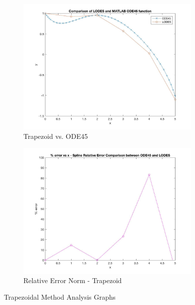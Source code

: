 \documentclass[12pt, titlepage]{article}
\begin{document}
\begin{figure}[H]
\centering
\begin{subfigure}{.55\textwidth}
  \centering
  \includegraphics[width=\linewidth]{images/Test4/2LODESvsMATLABPlot.jpg}
  \caption{Trapezoid vs. ODE45}
  \label{fig:trap4a}
\end{subfigure}%
\begin{subfigure}{.55\textwidth}
  \centering
  \includegraphics[width=\linewidth]{images/Test4/2RelativeErrorPlot.jpg}
  \caption{Relative Error Norm - Trapezoid}
  \label{fig:trap4b}
\end{subfigure}
\caption{Trapezoidal Method Analysis Graphs}
\label{fig:trap4}
\end{figure}
\end{document}
